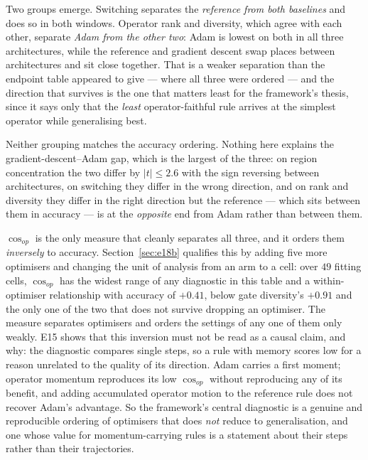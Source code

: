 \documentclass{article} %
\theoremstyle{plain}
\theoremstyle{definition}
\theoremstyle{remark}
\begin{document}
Two groups emerge. Switching separates the \emph{reference from both baselines} and does so in both
windows. Operator rank and diversity, which agree with each other, separate \emph{Adam from the
other two}: Adam is lowest on both in all three architectures, while the reference and gradient
descent swap places between architectures and sit close together. That is a weaker separation than
the endpoint table appeared to give --- where all three were ordered --- and the direction that
survives is the one that matters least for the framework's thesis, since it says only that the
\emph{least} operator-faithful rule arrives at the simplest operator while generalising best.

Neither grouping matches the accuracy ordering. Nothing here explains the gradient-descent--Adam
gap, which is the largest of the three: on region concentration the two differ by $|t| \le 2.6$
with the sign reversing between architectures, on switching they differ in the wrong direction, and on
rank and diversity they differ in the right direction but the reference --- which sits between them
in accuracy --- is at the \emph{opposite} end from Adam rather than between them.

$\cos_{op}$ is the only measure that cleanly separates all three, and it orders them \emph{inversely}
to accuracy. Section~\ref{sec:e18b} qualifies this by adding five more optimisers and changing the
unit of analysis from an arm to a cell: over $49$ fitting cells, $\cos_{op}$ has the widest range
of any diagnostic in this table and a within-optimiser relationship with accuracy of $+0.41$,
below gate diversity's $+0.91$ and the only one of the two that does not survive dropping an
optimiser. The measure separates optimisers and orders the settings of any one of them only
weakly. E15 shows that this inversion must not be read as a causal claim, and why: the
diagnostic compares single steps, so a rule with memory scores low for a reason unrelated to the
quality of its direction. Adam carries a first moment; operator momentum reproduces its low
$\cos_{op}$ without reproducing any of its benefit, and adding accumulated operator motion to the
reference rule does not recover Adam's advantage. So the framework's central diagnostic is a genuine
and reproducible ordering of optimisers that does \emph{not} reduce to generalisation, and one whose
value for momentum-carrying rules is a statement about their steps rather than their trajectories.
\end{document}
